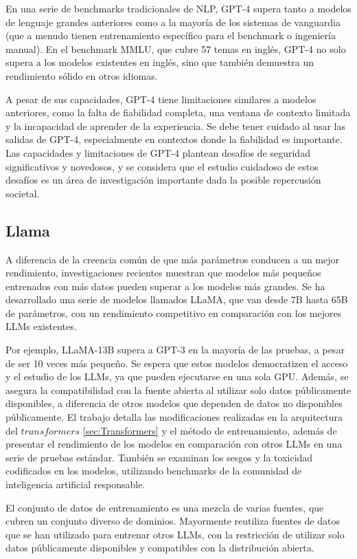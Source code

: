 En una serie de benchmarks tradicionales de NLP, GPT-4 supera tanto a modelos de lenguaje grandes anteriores como a la mayoría de los sistemas de vanguardia (que a menudo tienen entrenamiento específico para el benchmark o ingeniería manual). En el benchmark MMLU, que cubre 57 temas en inglés, GPT-4 no solo supera a los modelos existentes en inglés, sino que también demuestra un rendimiento sólido en otros idiomas.

A pesar de sus capacidades, GPT-4 tiene limitaciones similares a modelos anteriores, como la falta de fiabilidad completa, una ventana de contexto limitada y la incapacidad de aprender de la experiencia. Se debe tener cuidado al usar las salidas de GPT-4, especialmente en contextos donde la fiabilidad es importante. Las capacidades y limitaciones de GPT-4 plantean desafíos de seguridad significativos y novedosos, y se considera que el estudio cuidadoso de estos desafíos es un área de investigación importante dada la posible repercusión societal.
\subsection{Llama}
A diferencia de la creencia común de que más parámetros conducen a un mejor rendimiento, investigaciones recientes muestran que modelos más pequeños entrenados con más datos pueden superar a los modelos más grandes. Se ha desarrollado una serie de modelos llamados LLaMA, \cite{touvron2023llama} que van desde 7B hasta 65B de parámetros, con un rendimiento competitivo en comparación con los mejores LLMs existentes.

Por ejemplo, LLaMA-13B supera a GPT-3 en la mayoría de las pruebas, a pesar de ser 10 veces más pequeño. Se espera que estos modelos democratizen el acceso y el estudio de los LLMs, ya que pueden ejecutarse en una sola GPU. Además, se asegura la compatibilidad con la fuente abierta al utilizar solo datos públicamente disponibles, a diferencia de otros modelos que dependen de datos no disponibles públicamente. El trabajo detalla las modificaciones realizadas en la arquitectura del $transformers$ \ref{sec:Transformers} y el método de entrenamiento, además de presentar el rendimiento de los modelos en comparación con otros LLMs en una serie de pruebas estándar. También se examinan los sesgos y la toxicidad codificados en los modelos, utilizando benchmarks de la comunidad de inteligencia artificial responsable.

El conjunto de datos de entrenamiento es una mezcla de varias fuentes, que cubren un conjunto diverso de dominios. Mayormente reutiliza fuentes de datos que se han utilizado para entrenar otros LLMs, con la restricción de utilizar solo datos públicamente disponibles y compatibles con la distribución abierta.

